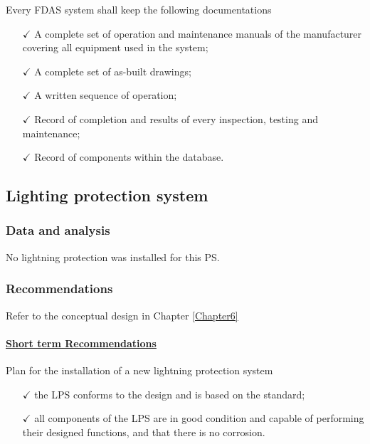 Every FDAS system shall keep the following documentations
\begin{itemize}%
	\item [$\checkmark$] A complete set of operation and maintenance manuals of the manufacturer covering all equipment used in the system;
	\item [$\checkmark$] A complete set of as-built drawings;
	\item [$\checkmark$] A written sequence of operation;
	\item [$\checkmark$] Record of completion and results of every inspection, testing and maintenance;
	\item [$\checkmark$] Record of components within the database.
\end{itemize}



\subsection{Lighting protection system} \label{ch04fdas02}
\subsubsection{Data and analysis}
No lightning protection was installed for this PS.

\subsubsection{Recommendations}

Refer to the conceptual design in Chapter \ref{Chapter6}

\paragraph{\underline{Short term Recommendations}}

Plan for the installation of a new lightning protection system 
\begin{itemize}%
	\item [$\checkmark$] the LPS conforms to the design and is based on the  standard;
	\item [$\checkmark$] all components of the LPS are in good condition and capable of performing their designed functions, and that there is no corrosion.
\end{itemize}


